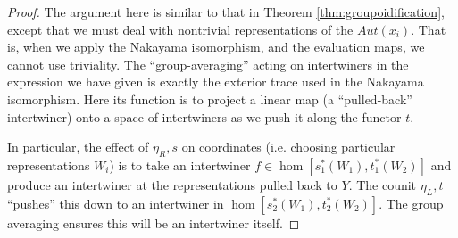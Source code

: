 \documentclass[10pt]{amsart}
\numberwithin{theorem}{subsection}
\newcommand{\opname}[1]{\operatorname{#1}}
\begin{document}
\begin{proof}
The argument here is similar to that in Theorem
\ref{thm:groupoidification}, except that we must deal with nontrivial
representations of the $Aut(x_i)$.  That is, when we apply the
Nakayama isomorphism, and the evaluation maps, we cannot use
triviality.  The ``group-averaging'' acting on intertwiners in the
expression we have given is exactly the exterior trace used in the
Nakayama isomorphism.  Here its function is to project a linear map (a
``pulled-back'' intertwiner) onto a space of intertwiners as we push
it along the functor $t$.

In particular, the effect of $\eta_R,s$ on coordinates (i.e. choosing
particular representations $W_i$) is to take an intertwiner $f \in
\opname{hom}[s_1^{\ast}(W_1),t_1^{\ast}(W_2)]$ and produce an
intertwiner at the representations pulled back to $Y$.  The counit
$\eta_L,t$ ``pushes'' this down to an intertwiner in
$\opname{hom}[s_2^{\ast}(W_1),t_2^{\ast}(W_2)]$.  The group averaging
ensures this will be an intertwiner itself.
\end{proof}
\end{document}
